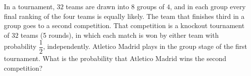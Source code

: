 In a tournament, $32$ teams are drawn into $8$ groups of $4$, and in each group every final ranking of the four teams is equally likely. The team that finishes third in a group goes to a second competition. That competition is a knockout tournament of $32$ teams (5 rounds), in which each match is won by either team with probability $\dfrac{1}{2}$, independently. Atletico Madrid plays in the group stage of the first tournament. What is the probability that Atletico Madrid wins the second competition?
